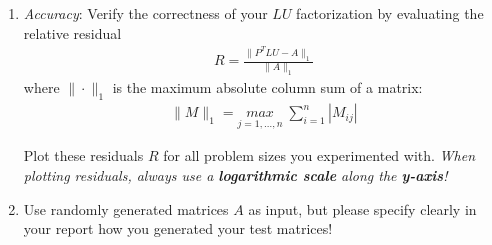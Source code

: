 \documentclass{scrartcl}
\begin{document}
    \begin{enumerate}
        \item \textit{Accuracy}: Verify the correctness of your $LU$ factorization by evaluating the relative residual
        \begin{align*}
            R = \frac{\|P^TLU - A\|_{1}}{\|A\|_{1}}
        \end{align*}
        where $\|\cdot\|_{1}$ is the maximum absolute column sum of a matrix:
        \begin{align*}
            \|M\|_{1} = \underset{j = 1, \dots, n}{max} \; \sum_{i=1}^{n} |M_{ij}|
        \end{align*}
        
        Plot these residuals $R$ for all problem sizes you experimented with.
        \emph{When plotting residuals, always use a \textbf{logarithmic scale} along the \textbf{y-axis}!}
        
        \item Use randomly generated matrices $A$ as input, but please specify clearly in your report how you generated your test matrices!
        
        
        
    \end{enumerate}
    
\end{document}
